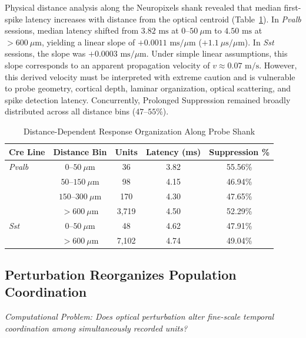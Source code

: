 \documentclass[10pt,journal,compsoc]{IEEEtran}
\begin{document}
Physical distance analysis along the Neuropixels shank revealed that median first-spike latency increases with distance from the optical centroid (Table~\ref{tab:spatial}). In \textit{Pvalb} sessions, median latency shifted from $3.82\text{ ms}$ at $0–50\ \mu\text{m}$ to $4.50\text{ ms}$ at $>600\ \mu\text{m}$, yielding a linear slope of $+0.0011\text{ ms}/\mu\text{m}$ ($+1.1\ \mu\text{s}/\mu\text{m}$). In \textit{Sst} sessions, the slope was $+0.0003\text{ ms}/\mu\text{m}$. Under simple linear assumptions, this slope corresponds to an apparent propagation velocity of $v \approx 0.07\text{ m/s}$. However, this derived velocity must be interpreted with extreme caution and is vulnerable to probe geometry, cortical depth, laminar organization, optical scattering, and spike detection latency. Concurrently, Prolonged Suppression remained broadly distributed across all distance bins ($47–55\%$).

\begin{table}[h]
\caption{Distance-Dependent Response Organization Along Probe Shank}
\label{tab:spatial}
\centering
\begin{tabular}{lcccc}
\toprule
\textbf{Cre Line} & \textbf{Distance Bin} & \textbf{Units} & \textbf{Latency (ms)} & \textbf{Suppression \%} \\
\midrule
\textit{Pvalb} & $0–50\ \mu\text{m}$   & 36    & 3.82 & 55.56\% \\
               & $50–150\ \mu\text{m}$  & 98    & 4.15 & 46.94\% \\
               & $150–300\ \mu\text{m}$ & 170   & 4.30 & 47.65\% \\
               & $>600\ \mu\text{m}$   & 3,719 & 4.50 & 52.29\% \\
\textit{Sst}   & $0–50\ \mu\text{m}$   & 48    & 4.62 & 47.91\% \\
               & $>600\ \mu\text{m}$   & 7,102 & 4.74 & 49.04\% \\
\bottomrule
\end{tabular}
\end{table}

\subsection{Perturbation Reorganizes Population Coordination}
\textit{Computational Problem: Does optical perturbation alter fine-scale temporal coordination among simultaneously recorded units?}
\end{document}
